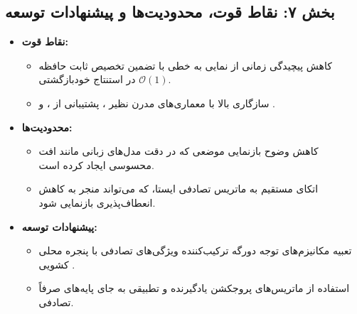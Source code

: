 \subsection*{بخش ۷: نقاط قوت، محدودیت‌ها و پیشنهادات توسعه }
\begin{itemize}
\item \textbf{نقاط قوت:} 
  \begin{itemize}
    \item کاهش پیچیدگی زمانی از نمایی به خطی با تضمین تخصیص ثابت حافظه $\mathcal{O}(1)$ در استنتاج خودبازگشتی.
    \item سازگاری بالا با معماری‌های مدرن نظیر ، پشتیبانی از ،  و .
  \end{itemize}
\item \textbf{محدودیت‌ها:}
  \begin{itemize}
    \item کاهش وضوح بازنمایی موضعی که در دقت مدل‌های زبانی مانند  افت محسوسی  ایجاد کرده است.
    \item اتکای مستقیم به ماتریس تصادفی ایستا، که می‌تواند منجر به کاهش انعطاف‌پذیری بازنمایی شود.
  \end{itemize}
\item \textbf{پیشنهادات توسعه:}
  \begin{itemize}
    \item تعبیه مکانیزم‌های توجه دورگه  ترکیب‌کننده ویژگی‌های تصادفی با پنجره محلی کشویی .
    \item استفاده از ماتریس‌های پروجکشن یادگیرنده و تطبیقی به جای پایه‌های صرفاً تصادفی.
  \end{itemize}
\end{itemize}

